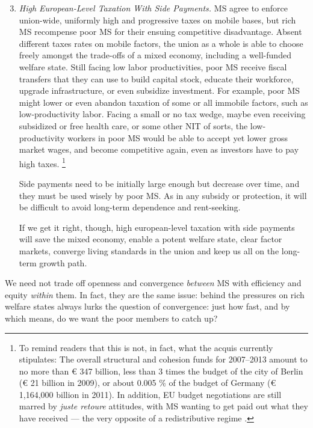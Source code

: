 \begin{enumerate}
	\setcounter{enumi}{2}
	\item \emph{High European-Level Taxation With Side Payments.}
	\gls{MS} agree to enforce union-wide, uniformly high and progressive taxes on mobile bases, but rich \gls{MS} recompense poor \gls{MS} for their ensuing competitive disadvantage.
	Absent different taxes rates on mobile factors, the union as a whole is able to choose freely amongst the trade-offs of a mixed economy, including a well-funded welfare state.
	Still facing low labor productivities, poor \gls{MS} receive fiscal transfers that they can use to build capital stock, educate their workforce, upgrade infrastructure, or even subsidize investment.
	For example, poor \gls{MS} might lower or even abandon taxation of some or all immobile factors, such as low-productivity labor.
	Facing a small or no tax wedge, maybe even receiving subsidized or free health care, or some other \gls{NIT} of sorts, the low-productivity workers in poor \gls{MS} would be able to accept yet lower gross market wages, and become competitive again, even as investors have to pay high taxes.
	\footnote{
		To remind readers that this is not, in fact, what the acquis currently stipulates:
		The overall structural and cohesion funds for 2007--2013 amount to no more than \euro{} 347 billion, less than 3 times the budget of the city of Berlin (\euro{} 21 billion in 2009), or about 0.005 \% of the budget of Germany (\euro{} 1,164,000 billion in 2011).
		In addition, \gls{EU} budget negotiations are still marred by \emph{juste retoure} attitudes, with \gls{MS} wanting to get paid out what they have received --- the very opposite of a redistributive regime \cite[for example,][]{Begg2008a}.
	}

	Side payments need to be initially large enough but decrease over time, and they must be used wisely by poor \gls{MS}.
	As in any subsidy or  protection, it will be difficult to avoid long-term dependence and rent-seeking.

	If we get it right, though, high european-level taxation with side payments will save the mixed economy, enable a potent welfare state, clear factor markets, converge living standards in the union and keep us all on the long-term growth path.
\end{enumerate}


We need not trade off openness and convergence \emph{between} \gls{MS} with efficiency and equity \emph{within} them.
In fact, they are the same issue:
behind the pressures on rich welfare states always lurks the question of convergence:
just how fast, and by which means, do we want the poor members to catch up?

